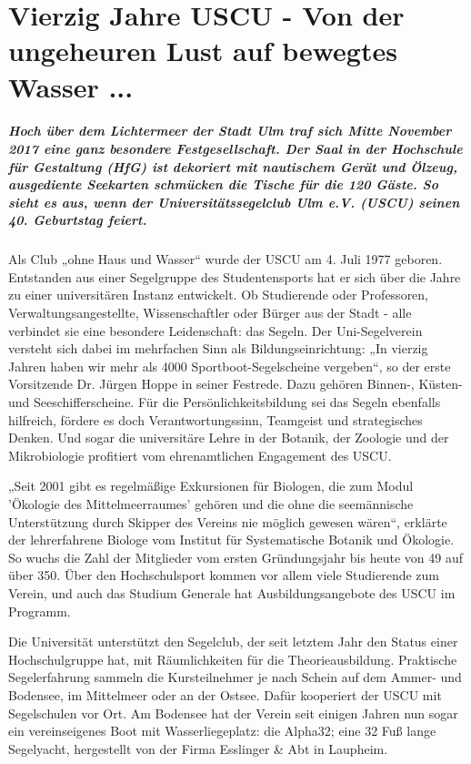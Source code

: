 \chapter[Vierzig Jahre USCU]{Vierzig Jahre USCU -  Von der ungeheuren Lust auf bewegtes Wasser ... }
\label{cha:2}

\paragraph{Hoch über dem Lichtermeer der Stadt Ulm traf sich Mitte November 2017 eine ganz besondere Festgesellschaft. Der Saal in der Hochschule für Gestaltung (HfG) ist dekoriert mit nautischem Gerät und Ölzeug, ausgediente Seekarten schmücken die Tische für die 120 Gäste. So sieht es aus, wenn der Universitätssegelclub Ulm e.V. (USCU) seinen 40. Geburtstag feiert.}
Als Club „ohne Haus und Wasser“ wurde der USCU am 4. Juli 1977 geboren. Entstanden aus einer Segelgruppe des Studentensports hat er sich über die Jahre zu einer universitären Instanz entwickelt. Ob Studierende oder Professoren, Verwaltungsangestellte, Wissenschaftler oder Bürger aus der Stadt - alle verbindet sie eine besondere Leidenschaft: das Segeln. Der Uni-Segelverein versteht sich dabei im mehrfachen Sinn als Bildungseinrichtung: „In vierzig Jahren haben wir mehr als 4000 Sportboot-Segelscheine vergeben“, so der erste Vorsitzende Dr. Jürgen Hoppe in seiner Festrede. Dazu gehören Binnen-, Küsten- und Seeschifferscheine. Für die Persönlichkeitsbildung sei das Segeln ebenfalls hilfreich, fördere es doch Verantwortungssinn, Teamgeist und strategisches Denken. Und sogar die universitäre Lehre in der Botanik, der Zoologie und der Mikrobiologie profitiert vom ehrenamtlichen Engagement des USCU. 

„Seit 2001 gibt es regelmäßige Exkursionen für Biologen, die zum Modul 'Ökologie des Mittelmeerraumes' gehören und die ohne die seemännische Unterstützung durch Skipper des Vereins nie möglich gewesen wären“, erklärte der lehrerfahrene Biologe vom Institut für Systematische Botanik und Ökologie. So wuchs die Zahl der Mitglieder vom ersten Gründungsjahr bis heute von 49 auf über 350. Über den Hochschulsport kommen vor allem viele Studierende zum Verein, und auch das Studium Generale hat Ausbildungsangebote des USCU im Programm. 

Die Universität unterstützt den Segelclub, der seit letztem Jahr den Status einer Hochschulgruppe hat, mit Räumlichkeiten für die Theorieausbildung. Praktische Segelerfahrung sammeln die Kursteilnehmer je nach Schein auf dem Ammer- und Bodensee, im Mittelmeer oder an der Ostsee. Dafür kooperiert der USCU mit Segelschulen vor Ort. Am Bodensee hat der Verein seit einigen Jahren nun sogar ein vereinseigenes Boot mit Wasserliegeplatz: die Alpha32; eine 32 Fuß lange Segelyacht, hergestellt von der Firma Esslinger \& Abt in Laupheim. 

